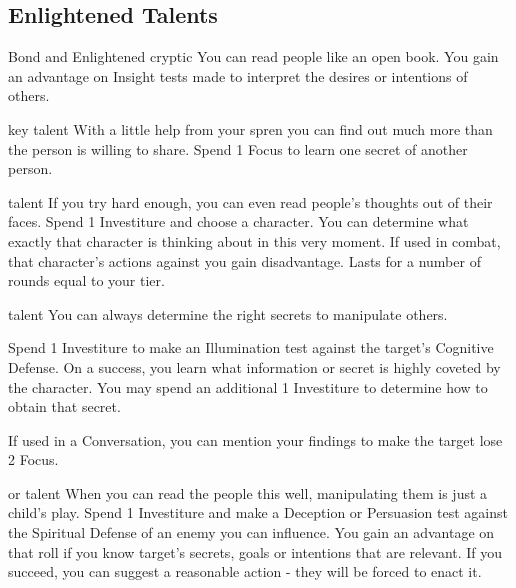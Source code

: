 \subsection{Enlightened Talents}

		{Bond and Enlightened cryptic }
		{\iconConstant}
		{You can read people like an open book.}
		{You gain an advantage on Insight tests made to interpret the desires or intentions of others.}

\newpage		
\talent{\talentLightweaverReadSecretsName}
		{\talentLightweaverKeyName{} key talent}
		{\iconAction}
		{With a little help from your spren you can find out much more than the person is willing to share.}
		{Spend 1 Focus to learn one secret of another person.}
		
\talent{\talentLightweaverDetectThoughtsName}
		{\talentLightweaverReadSecretsName{} talent}
		{\iconAction}
		{If you try hard enough, you can even read people's thoughts out of their faces.}
		{Spend 1 Investiture and choose a character. You can determine what exactly that character is thinking about in this very moment. If used in combat, that character's actions against you gain disadvantage. Lasts for a number of rounds equal to your tier.}
		
\talent{\talentLightweaverSecretsLureName}
		{\talentLightweaverReadSecretsName{} talent}
		{\iconAction}
		{You can always determine the right secrets to manipulate others.}
		{Spend 1 Investiture to make an Illumination test against the target's Cognitive Defense. On a success, you learn what information or secret is highly coveted by the character. You may spend an additional 1 Investiture to determine how to obtain that secret.

		If used in a Conversation, you can mention your findings to make the target lose 2 Focus.}
		
\talent{\talentLightweaverSuggestionName}
		{\talentLightweaverSecretsLureName{} or \talentLightweaverDetectThoughtsName{} talent}
		{\iconActionDouble}
		{When you can read the people this well, manipulating them is just a child's play.}
		{Spend 1 Investiture and make a Deception or Persuasion test against the Spiritual Defense of an enemy you can influence. You gain an advantage on that roll if you know target's secrets, goals or intentions that are relevant. If you succeed, you can suggest a reasonable action - they will be forced to enact it.}
		
